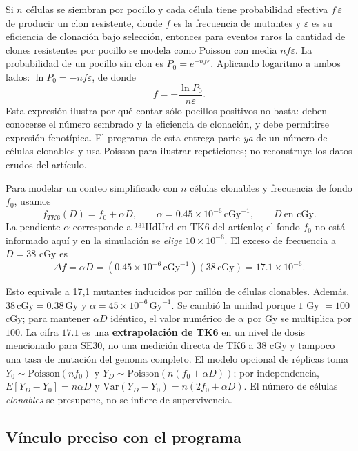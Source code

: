 \documentclass[11pt,a4paper,oneside]{article}
\begin{document}
Si \(n\) células se siembran por pocillo y cada célula tiene probabilidad efectiva \(f\,\varepsilon\) de producir un clon resistente, donde \(f\) es la frecuencia de mutantes y \(\varepsilon\) es su eficiencia de clonación bajo selección, entonces para eventos raros la cantidad de clones resistentes por pocillo se modela como Poisson con media \(nf\varepsilon\). La probabilidad de un pocillo sin clon es \(P_0=e^{-nf\varepsilon}\). Aplicando logaritmo a ambos lados: \(\ln P_0=-nf\varepsilon\), de donde \[\boxed{f=-\frac{\ln P_0}{n\varepsilon}.}\] Esta expresión ilustra por qué contar sólo pocillos positivos no basta: deben conocerse el número sembrado y la eficiencia de clonación, y debe permitirse expresión fenotípica. El programa de esta entrega parte \emph{ya} de un número de células clonables y usa Poisson para ilustrar repeticiones; no reconstruye los datos crudos del artículo.

Para modelar un conteo simplificado con \(n\) células clonables y frecuencia de fondo \(f_0\), usamos \[f_{TK6}(D)=f_0+\alpha D,\qquad \alpha=0.45\times10^{-6}\,\mathrm{cGy}^{-1},\qquad D\ \text{en cGy}.\] La pendiente \(\alpha\) corresponde a ¹³¹IIdUrd en TK6 del artículo; el fondo \(f_0\) no está informado aquí y en la simulación se \emph{elige} \(10\times10^{-6}\). El exceso de frecuencia a \(D=38\) cGy es \[\Delta f=\alpha D=(0.45\times10^{-6}\,\mathrm{cGy}^{-1})(38\,\mathrm{cGy})=17.1\times10^{-6}.\]

Esto equivale a 17,1 mutantes inducidos por millón de células clonables. Además, \(38\,\mathrm{cGy}=0.38\,\mathrm{Gy}\) y \(\alpha=45\times10^{-6}\,\mathrm{Gy}^{-1}\). Se cambió la unidad porque \(1\) Gy \(=100\) cGy; para mantener \(\alpha D\) idéntico, el valor numérico de \(\alpha\) por Gy se multiplica por \(100\). La cifra \(17.1\) es una \textbf{extrapolación de TK6} en un nivel de dosis mencionado para SE30, no una medición directa de TK6 a 38 cGy y tampoco una tasa de mutación del genoma completo. El modelo opcional de réplicas toma \(Y_0\sim\mathrm{Poisson}(nf_0)\) y \(Y_D\sim\mathrm{Poisson}(n(f_0+\alpha D))\); por independencia, \(E[Y_D-Y_0]=n\alpha D\) y \(\mathrm{Var}(Y_D-Y_0)=n(2f_0+\alpha D)\). El número de células \emph{clonables} se presupone, no se infiere de supervivencia.

\subsection{Vínculo preciso con el programa}\label{vuxednculo-preciso-con-el-programa}
\end{document}
